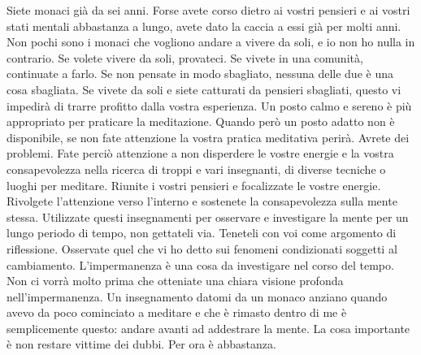 Siete monaci già da sei anni. Forse avete corso dietro ai vostri
pensieri e ai vostri stati mentali abbastanza a lungo, avete dato la
caccia a essi già per molti anni. Non pochi sono i monaci che vogliono
andare a vivere da soli, e io non ho nulla in contrario. Se volete
vivere da soli, provateci. Se vivete in una comunità, continuate a
farlo. Se non pensate in modo sbagliato, nessuna delle due è una cosa
sbagliata. Se vivete da soli e siete catturati da pensieri sbagliati,
questo vi impedirà di trarre profitto dalla vostra esperienza. Un posto
calmo e sereno è più appropriato per praticare la meditazione. Quando
però un posto adatto non è disponibile, se non fate attenzione la vostra
pratica meditativa perirà. Avrete dei problemi. Fate perciò attenzione a
non disperdere le vostre energie e la vostra consapevolezza nella
ricerca di troppi e vari insegnanti, di diverse tecniche o luoghi per
meditare. Riunite i vostri pensieri e focalizzate le vostre energie.
Rivolgete l'attenzione verso l'interno e sostenete la consapevolezza
sulla mente stessa. Utilizzate questi insegnamenti per osservare e
investigare la mente per un lungo periodo di tempo, non gettateli via.
Teneteli con voi come argomento di riflessione. Osservate quel che vi ho
detto sui fenomeni condizionati soggetti al cambiamento. L'impermanenza
è una cosa da investigare nel corso del tempo. Non ci vorrà molto prima
che otteniate una chiara visione profonda nell'impermanenza. Un
insegnamento datomi da un monaco anziano quando avevo da poco cominciato
a meditare e che è rimasto dentro di me è semplicemente questo: andare
avanti ad addestrare la mente. La cosa importante è non restare vittime
dei dubbi. Per ora è abbastanza.

